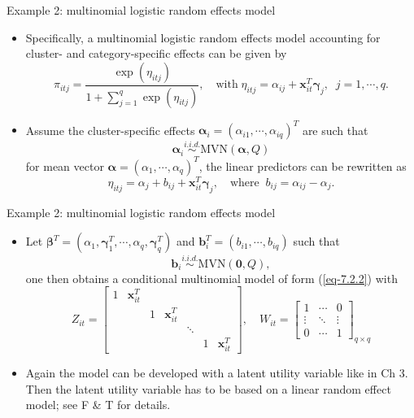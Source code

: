 \documentclass{beamer}
\newcommand{\boldbeta}{{\boldsymbol \beta}}
\newcommand{\boldalpha}{{\boldsymbol \alpha}}
\newcommand{\boldgamma}{{\boldsymbol \gamma}}
\begin{document}
\begin{frame}{Example 2: multinomial logistic random effects model}

\begin{itemize}

\item
Specifically, a multinomial logistic random effects model accounting for cluster- and category-specific effects can be 
given by
$$\pi_{itj}=\frac{\exp(\eta_{itj})}{1+\sum_{j=1}^q\exp(\eta_{itj})}, \quad\mbox{with}\;
\eta_{itj}=\alpha_{ij}+\mathbf{x}_{it}^T\boldgamma_j,\;\; j=1,\cdots, q.$$


\item
Assume the cluster-specific effects $\boldalpha_i=(\alpha_{i1},\cdots,\alpha_{iq})^T$ are such that 
\[
\boldalpha_i \stackrel{i.i.d.}{\sim}
\text{MVN}(\boldalpha, Q)
\]
for mean vector $\boldalpha=(\alpha_1,\cdots,\alpha_q)^T$,  the linear predictors can be rewritten as
$$\eta_{itj}=\alpha_j+b_{ij}+\mathbf{x}_{it}^T { \boldsymbol \gamma}_j, \quad\mbox{where}\;\;
b_{ij}=\alpha_{ij}-\alpha_j.$$

\end{itemize}
\end{frame}




\begin{frame}{Example 2: multinomial logistic random effects model}
\begin{itemize}

\item
Let $\boldbeta^T=(\alpha_1, \boldgamma_1^T, \cdots, \alpha_q,
\boldgamma_q^T)$ and
$\mathbf{b}_i^T=(b_{i1},\cdots, b_{iq})$ such that
\[
 \mathbf{b}_i \stackrel{i.i.d.}{\sim} \text{MVN}(\mathbf{0}, Q),
\]
 one then obtains a conditional multinomial model of form
(\ref{eq-7.2.2}) with
\[
Z_{it}=\left[\begin{array}{ccccccc}1 & \mathbf{x}_{it}^T & &&&& \\ & & 1 & \mathbf{x}_{it}^T &&& \\
& & & &\ddots & & \\ & & & && 1 & \mathbf{x}_{it}^T\end{array}\right], \quad
W_{it}=\left[\begin{array}{ccc} 1 & \cdots & 0 \\ \vdots & \ddots & \vdots \\ 0 & \cdots & 1
\end{array}\right]_{q\times q}
\]

\item Again the model can be developed with a latent utility variable like in Ch 3. Then the latent utility variable has to be based on a linear random effect model; see F \& T for details. 
\end{itemize}
\end{frame}
\end{document}
